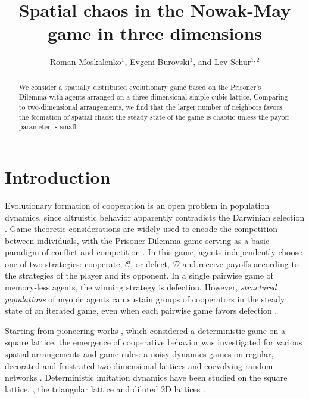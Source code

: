 \documentclass[a4paper]{jpconf}
\begin{document}
\title{Spatial chaos in the Nowak-May game in three dimensions}
%
\author{Roman Moskalenko$^{1}$, Evgeni Burovski$^{1}$, and Lev Schur$^{1, 2}$}
%
\address{$^1$ National Research University Higher School of Economics, 101000 Moscow, Russia}
\address{$^2$ Landau Institute for Theoretical Physics, 142432 Chernogolovka, Russia}


\begin{abstract}
We consider a spatially distributed evolutionary game based on the Prisoner's Dilemma 
with agents arranged on a three-dimensional simple cubic lattice. 
Comparing to two-dimensional arrangements, we find that the larger number of
neighbors favors the formation of spatial chaos: the steady state of the game 
is chaotic unless the payoff parameter is small.
\end{abstract}

\section{Introduction}

Evolutionary formation of cooperation is an open problem
in population dynamics, since altruistic behavior apparently contradicts the
Darwinian selection \cite{Axelrod2006}.
Game-theoretic considerations are widely used to encode the competition between
individuals, with the Prisoner Dilemma game serving as a basic paradigm of
conflict and competition \cite{Smith1982}.
In this game, agents independently choose one of two strategies: 
cooperate, $\mathcal{C}$, or defect, $\mathcal{D}$ and receive payoffs according
to the strategies of the player and its opponent. In a single pairwise game of
memory-less agents, the winning strategy is defection. However,
\emph{structured populations} of myopic agents can sustain groups of
cooperators in the steady state of an iterated game, even when each pairwise
game favors defection \cite{Nowak1992}.

Starting from pioneering works \cite{Nowak1992, Nowak1993}, which considered
a deterministic game on a square lattice, the emergence of cooperative behavior
was investigated for various spatial arrangements and game rules: a noisy
dynamics games on regular, decorated and frustrated two-dimensional lattices
\cite{Szolnoki2005, Hauert2005, Szolnoki2017} and coevolving random networks
\cite{Szolnoki2009}. Deterministic imitation dynamics have been studied
on the square lattice, \cite{Kolotev2018}, the triangular lattice
\cite{Burovski2019} and diluted 2D lattices \cite{Arenzon2001}.
\end{document}
